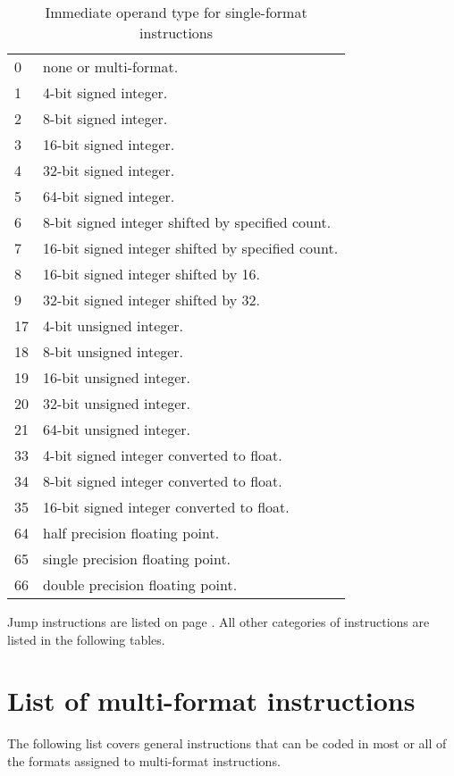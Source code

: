 \documentclass[forwardcom.tex]{subfiles}
\begin{document}
\begin{longtable} {|p{18mm}|p{100mm}|}
\caption{
Immediate operand type for single-format instructions} 
\label{table:immediateOperantTypesInInstructionList}
\\
\endfirsthead
\endhead
\hline
0 & none or multi-format. \\
1 & 4-bit signed integer. \\
2 & 8-bit signed integer. \\
3 & 16-bit signed integer. \\
4 & 32-bit signed integer. \\
5 & 64-bit signed integer. \\
6 & 8-bit signed integer shifted by specified count. \\
7 & 16-bit signed integer shifted by specified count. \\
8 & 16-bit signed integer shifted by 16. \\
9 & 32-bit signed integer shifted by 32. \\
17 & 4-bit unsigned integer. \\
18 & 8-bit unsigned integer. \\
19 & 16-bit unsigned integer. \\
20 & 32-bit unsigned integer. \\
21 & 64-bit unsigned integer. \\
33 & 4-bit signed integer converted to float. \\
34 & 8-bit signed integer converted to float. \\
35 & 16-bit signed integer converted to float. \\
64 & half precision floating point. \\
65 & single precision floating point. \\
66 & double precision floating point. \\
\hline
\end{longtable}

Jump instructions are listed on page \pageref{table:controlTransferInstructions}. All other categories of instructions are listed in the following tables.

\section{List of multi-format instructions}
The following list covers general instructions that can be coded in most or all of the formats
assigned to multi-format instructions.
\end{document}
